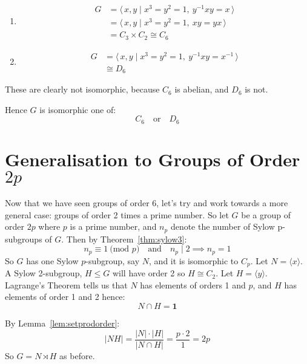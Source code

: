 \documentclass[a4paper, oneside, 12pt, final]{article}
\theoremstyle{definition}
\begin{document}
\begin{enumerate}
    \item
        \begin{equation*}
        \begin{aligned}
            G &= \langle\, x, y \mid x^3 = y^2 = 1,\ y^{-1}xy = x \,\rangle \\
            &=\langle\, x, y \mid x^3 = y^2 = 1,\ xy = yx \,\rangle \\
            &= C_3 \times C_2 \cong C_6
        \end{aligned}
        \end{equation*}

    \item
        \begin{equation*}
        \begin{aligned}
            G &= \langle\, x, y \mid x^3 = y^2 = 1,\ y^{-1}xy = x^{-1}
            \,\rangle \\
            &\cong D_6
        \end{aligned}
        \end{equation*}
\end{enumerate}

These are clearly not isomorphic, because \(C_6\) is abelian, and \(D_6\) is not.

Hence \(G\) is isomorphic one of:
\[C_6 \quad \text{or} \quad D_6\]

\section{Generalisation to Groups of Order \(2p\)}
Now that we have seen groups of order 6, let's try and work towards a more general case: groups of
order 2 times a prime number.
So let \(G\) be a group of order \(2p\) where \(p\) is a prime number, and \(n_p\) denote the number
of Sylow p-subgroups of \(G\).
Then by Theorem~\ref{thm:sylow3}:
\[n_p \equiv 1 \ \text{(mod \(p\))} \quad \text{and} \quad n_p \mid 2 \implies n_p = 1\]
So \(G\) has one Sylow \(p\)-subgroup, say \(N\), and it is isomorphic to \(C_p\).
Let \(N = \langle x \rangle\).
A Sylow 2-subgroup, \(H \leqslant G\) will have order 2 so \(H \cong C_2\).
Let \(H = \langle y \rangle\).
Lagrange's Theorem tells us that \(N\) has elements of orders 1 and \(p\), and \(H\) has elements of
order 1 and 2 hence:
\[N \cap H = \bm{1}\]

By Lemma~\ref{lem:setprodorder}:
\[|NH| = \frac{|N| \cdot |H|}{|N \cap H|} = \frac{p \cdot 2}{1} = 2p\]
So \(G = N \rtimes H\) as before.
\end{document}
